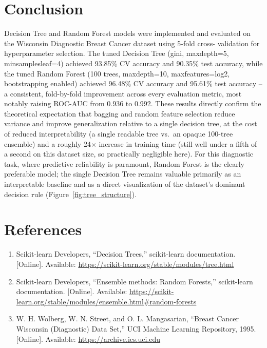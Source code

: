 \documentclass[12pt,a4paper]{article}
\DeclareRobustCommand{\_}{\textunderscore\allowbreak}
\begin{document}
\section{Conclusion}
Decision Tree and Random Forest models were implemented and evaluated on
the Wisconsin Diagnostic Breast Cancer dataset using 5-fold cross-
validation for hyperparameter selection. The tuned Decision Tree
(gini, max\_depth=5, min\_samples\_leaf=4) achieved 93.85\% CV accuracy and
90.35\% test accuracy, while the tuned Random Forest (100 trees, max\_depth=10,
max\_features=log2, bootstrapping enabled) achieved 96.48\% CV accuracy and
95.61\% test accuracy -- a consistent, fold-by-fold improvement across every
evaluation metric, most notably raising ROC-AUC from 0.936 to 0.992. These
results directly confirm the theoretical expectation that bagging and
random feature selection reduce variance and improve generalization
relative to a single decision tree, at the cost of reduced interpretability
(a single readable tree vs.\ an opaque 100-tree ensemble) and a roughly
24$\times$ increase in training time (still well under a fifth of a second
on this dataset size, so practically negligible here). For this diagnostic
task, where predictive reliability is paramount, Random Forest is the
clearly preferable model; the single Decision Tree remains valuable
primarily as an interpretable baseline and as a direct visualization of the
dataset's dominant decision rule (Figure~\ref{fig:tree_structure}).

\section{References}
\begin{enumerate}
\item Scikit-learn Developers, ``Decision Trees,'' scikit-learn
documentation. [Online]. Available:
\url{https://scikit-learn.org/stable/modules/tree.html}
\item Scikit-learn Developers, ``Ensemble methods: Random Forests,''
scikit-learn documentation. [Online]. Available:
\url{https://scikit-learn.org/stable/modules/ensemble.html#random-forests}
\item W. H. Wolberg, W. N. Street, and O. L. Mangasarian, ``Breast Cancer
Wisconsin (Diagnostic) Data Set,'' UCI Machine Learning Repository, 1995.
[Online]. Available: \url{https://archive.ics.uci.edu}
\end{enumerate}
\end{document}
